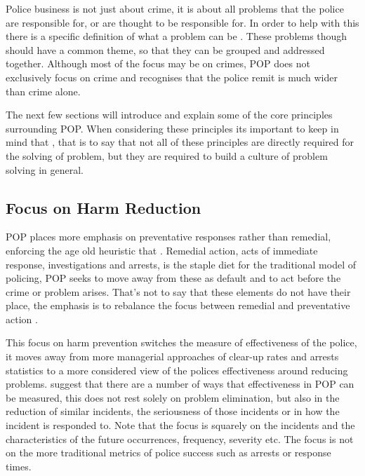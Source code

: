 Police business is not just about crime, it is about all problems that the police are responsible for, or are thought to be responsible for. In order to help with this there is a specific definition of what a problem can be  \parencite{popchap11}. These problems though should have a common theme, so that they can be grouped and addressed together. Although most of the focus may be on crimes, POP does not exclusively focus on crime and recognises that the police remit is much wider than crime alone.  


The next few sections will introduce and explain some of the core principles surrounding POP. When considering these principles its important to keep in mind that  \parencite{scott2020problem}, that is to say that not all of these principles are directly required for the solving of  problem, but they are required to build a culture of problem solving in general. 


\subsection{Focus on Harm Reduction}POP places more emphasis on preventative responses rather than remedial, enforcing the age old heuristic that . Remedial action, acts of immediate response, investigations and arrests, is the staple diet for the traditional model of policing, POP seeks to move away from these as default and to act before the crime or problem arises. That’s not to say that these elements do not have their place, the emphasis is to rebalance the focus between remedial and preventative action \parencite{goldstein1990}. 

This focus on harm prevention switches the measure of effectiveness of the police, it moves away from more managerial approaches of clear-up rates and arrests statistics to a more considered view of the polices effectiveness around reducing problems\parencite{goldstein1990}.  \textcite{eck1987problem} suggest that there are a number of ways that effectiveness in POP can be measured, this does not rest solely on problem elimination, but also in the reduction of similar incidents, the seriousness of those incidents or in how the incident is responded to. Note that the focus is squarely on the incidents and the characteristics of the future occurrences, frequency, severity etc. The focus is not on the more traditional metrics of police success such as arrests or response times.

